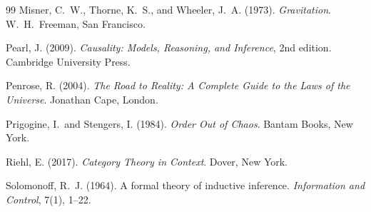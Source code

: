 \documentclass[12pt, oneside]{article}
\begin{document}
\begin{thebibliography}{99}
Misner, C.\ W., Thorne, K.\ S., and Wheeler, J.\ A. (1973).
\newblock \emph{Gravitation}.
\newblock W.\ H.\ Freeman, San Francisco.

Pearl, J. (2009).
\newblock \emph{Causality: Models, Reasoning, and Inference}, 2nd edition.
\newblock Cambridge University Press.

Penrose, R. (2004).
\newblock \emph{The Road to Reality: A Complete Guide to the Laws of the Universe}.
\newblock Jonathan Cape, London.

Prigogine, I.\ and Stengers, I. (1984).
\newblock \emph{Order Out of Chaos}.
\newblock Bantam Books, New York.

Riehl, E. (2017).
\newblock \emph{Category Theory in Context}.
\newblock Dover, New York.

Solomonoff, R.\ J. (1964).
\newblock A formal theory of inductive inference.
\newblock \emph{Information and Control}, 7(1), 1--22.

\end{thebibliography}
\end{document}
